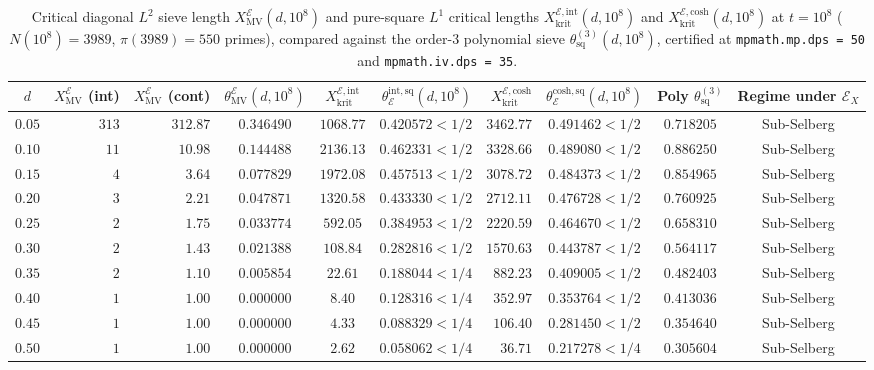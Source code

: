 \documentclass[11pt,reqno]{amsart}
\theoremstyle{definition}
\theoremstyle{remark}
\numberwithin{equation}{section}
\begin{document}
\begin{table}[t]
\centering
\caption{Critical diagonal $L^2$ sieve length $X_{\mathrm{MV}}^{\mathcal{E}}(d, 10^8)$ and pure-square $L^1$ critical lengths $X_{\mathrm{krit}}^{\mathcal{E},\mathrm{int}}(d, 10^8)$ and $X_{\mathrm{krit}}^{\mathcal{E},\mathrm{cosh}}(d, 10^8)$ at $t = 10^8$ ($N(10^8) = 3989$, $\pi(3989) = 550$ primes), compared against the order-$3$ polynomial sieve $\theta_{\mathrm{sq}}^{(3)}(d, 10^8)$, certified at \texttt{mpmath.mp.dps = 50} and \texttt{mpmath.iv.dps = 35}.}\label{tab:sub_selberg_1e8}
\scriptsize
\setlength{\tabcolsep}{3.0pt}
\begin{tabular}{@{}crrccrrccc@{}}
\toprule
$d$ & $X_{\mathrm{MV}}^{\mathcal{E}}$ (int) & $X_{\mathrm{MV}}^{\mathcal{E}}$ (cont) & $\theta_{\mathrm{MV}}^{\mathcal{E}}(d,10^8)$ & $X_{\mathrm{krit}}^{\mathcal{E},\mathrm{int}}$ & $\theta_{\mathcal{E}}^{\mathrm{int,sq}}(d,10^8)$ & $X_{\mathrm{krit}}^{\mathcal{E},\mathrm{cosh}}$ & $\theta_{\mathcal{E}}^{\mathrm{cosh,sq}}(d,10^8)$ & Poly $\theta_{\mathrm{sq}}^{(3)}$ & Regime under $\mathcal{E}_X$ \\
\midrule
$0.05$ & $313$ & $312.87$ & $0.346490$ & $1068.77$ & $0.420572 < 1/2$ & $3462.77$ & $0.491462 < 1/2$ & $0.718205$ & Sub-Selberg \\
$0.10$ & $11$  & $10.98$  & $0.144488$ & $2136.13$ & $0.462331 < 1/2$ & $3328.66$ & $0.489080 < 1/2$ & $0.886250$ & Sub-Selberg \\
$0.15$ & $4$   & $3.64$   & $0.077829$ & $1972.08$ & $0.457513 < 1/2$ & $3078.72$ & $0.484373 < 1/2$ & $0.854965$ & Sub-Selberg \\
$0.20$ & $3$   & $2.21$   & $0.047871$ & $1320.58$ & $0.433330 < 1/2$ & $2712.11$ & $0.476728 < 1/2$ & $0.760925$ & Sub-Selberg \\
$0.25$ & $2$   & $1.75$   & $0.033774$ & $592.05$  & $0.384953 < 1/2$ & $2220.59$ & $0.464670 < 1/2$ & $0.658310$ & Sub-Selberg \\
$0.30$ & $2$   & $1.43$   & $0.021388$ & $108.84$  & $0.282816 < 1/2$ & $1570.63$ & $0.443787 < 1/2$ & $0.564117$ & Sub-Selberg \\
$0.35$ & $2$   & $1.10$   & $0.005854$ & $22.61$   & $0.188044 < 1/4$ & $882.23$  & $0.409005 < 1/2$ & $0.482403$ & Sub-Selberg \\
$0.40$ & $1$   & $1.00$   & $0.000000$ & $8.40$    & $0.128316 < 1/4$ & $352.97$  & $0.353764 < 1/2$ & $0.413036$ & Sub-Selberg \\
$0.45$ & $1$   & $1.00$   & $0.000000$ & $4.33$    & $0.088329 < 1/4$ & $106.40$  & $0.281450 < 1/2$ & $0.354640$ & Sub-Selberg \\
$0.50$ & $1$   & $1.00$   & $0.000000$ & $2.62$    & $0.058062 < 1/4$ & $36.71$   & $0.217278 < 1/4$ & $0.305604$ & Sub-Selberg \\
\bottomrule
\end{tabular}
\end{table}
\end{document}

